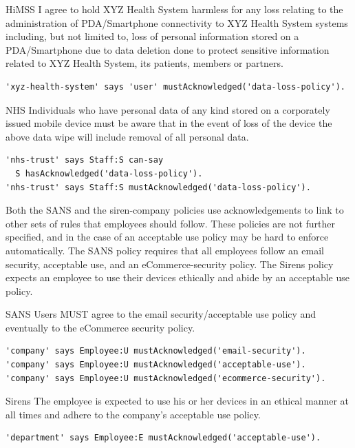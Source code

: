 \documentclass[thesis.tex]{subfiles}
\begin{document}
\begin{center}
  \noindent
    \begin{policyrule}{HiMSS}
      I agree to hold XYZ Health System harmless for any loss relating to the
      administration of PDA/Smartphone connectivity to XYZ Health System systems
      including, but not limited to, loss of personal information stored on a
      PDA/Smartphone due to data deletion done to protect sensitive information
      related to XYZ Health System, its patients, members or partners.
      \normalfont
      \begin{lstlisting}
'xyz-health-system' says 'user' mustAcknowledged('data-loss-policy').
      \end{lstlisting}
    \end{policyrule}
    \begin{policyrule}{NHS}
      Individuals who have personal data of any kind stored on a corporately
      issued mobile device must be aware that in the event of loss of the device
      the above data wipe will include removal of all personal data.
      \normalfont
      \begin{lstlisting}
'nhs-trust' says Staff:S can-say
  S hasAcknowledged('data-loss-policy').
'nhs-trust' says Staff:S mustAcknowledged('data-loss-policy').
      \end{lstlisting}
    \end{policyrule}
\end{center}

Both the SANS and the siren-company policies use acknowledgements to link to other sets of rules that employees should follow.
These policies are not further specified, and in the case of an acceptable use policy may be hard to enforce automatically.
The SANS policy requires that all employees follow an email security, acceptable use, and an eCommerce-security policy.
The Sirens policy expects an employee to use their devices ethically and abide by an acceptable use policy.

\begin{policyrule}{SANS}
  Users MUST agree to the email security/acceptable use policy and eventually to the eCommerce security policy.
  \begin{lstlisting}
'company' says Employee:U mustAcknowledged('email-security').
'company' says Employee:U mustAcknowledged('acceptable-use').
'company' says Employee:U mustAcknowledged('ecommerce-security').
  \end{lstlisting}
\end{policyrule}
\begin{policyrule}{Sirens}
  The employee is expected to use his or her devices in an ethical manner at all times and adhere to the company's acceptable use policy.
  \begin{lstlisting}
'department' says Employee:E mustAcknowledged('acceptable-use').
  \end{lstlisting}
\end{policyrule}
\end{document}
